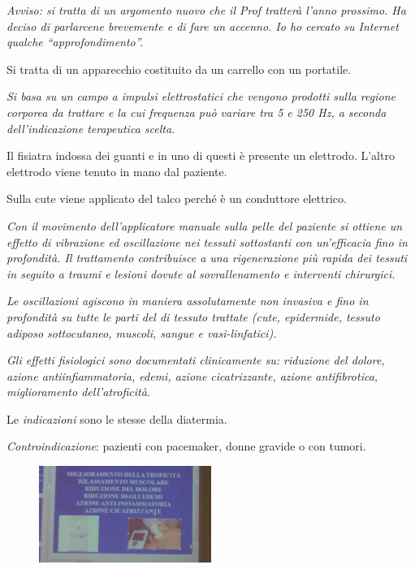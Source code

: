 \emph{Avviso: si tratta di un argomento nuovo che il Prof tratterà
l'anno prossimo. Ha deciso di parlarcene brevemente e di fare un
accenno. Io ho cercato su Internet qualche ``approfondimento''.}

Si tratta di un apparecchio costituito da un carrello con un portatile.

\emph{Si basa su un campo a impulsi elettrostatici che vengono prodotti
sulla regione corporea da trattare e la cui frequenza può variare tra 5
e 250 Hz, a seconda dell'indicazione terapeutica scelta.}

Il fisiatra indossa dei guanti e in uno di questi è presente un
elettrodo. L'altro elettrodo viene tenuto in mano dal paziente.

Sulla cute viene applicato del talco perché è un conduttore elettrico.

\emph{Con il movimento dell'applicatore manuale sulla pelle del paziente
si ottiene un effetto di vibrazione ed oscillazione nei tessuti
sottostanti con un'efficacia fino in profondità. Il trattamento
contribuisce a una rigenerazione più rapida dei tessuti in seguito a
traumi e lesioni dovute al sovrallenamento e interventi chirurgici.}

\emph{Le oscillazioni agiscono in maniera assolutamente non invasiva e
fino in profondità su tutte le parti del di tessuto trattate (cute,
epidermide, tessuto adiposo sottocutaneo, muscoli, sangue e
vasi-linfatici).}

\emph{Gli effetti fisiologici sono documentati clinicamente su:
riduzione del dolore, azione antiinfiammatoria, edemi, azione
cicatrizzante, azione antifibrotica, miglioramento dell'atroficità.}

Le \emph{indicazioni} sono le stesse della diatermia.

\emph{Controindicazione}: pazienti con pacemaker, donne gravide o con
tumori.

\begin{figure}[!ht]
\centering
	\includegraphics[width=0.5\textwidth]{032/image2.jpeg}
\end{figure}

